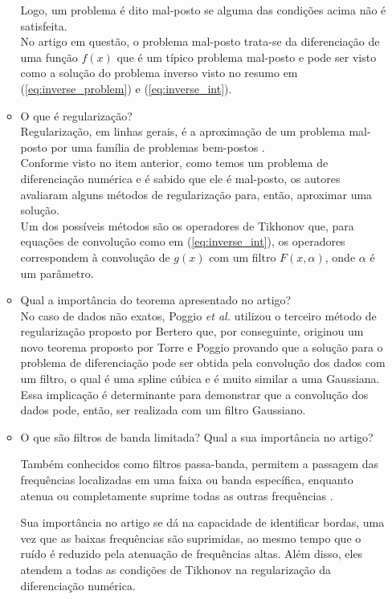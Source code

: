 \documentclass[12pt]{article}
\begin{document}
\begin{itemize}
\begin{itemize}
Logo, um problema é dito mal-posto se alguma das condições acima não é satisfeita.  
\\No artigo em questão, o problema mal-posto trata-se da diferenciação de uma função $f(x)$ que é um típico problema mal-posto e pode ser visto como a solução do problema inverso visto no resumo em (\ref{eq:inverse_problem}) e (\ref{eq:inverse_int}).\\

\item O que é regularização?
\\Regularização, em linhas gerais, é a aproximação de um problema mal-posto por uma família de problemas bem-postos \cite{Engl-1981}.
\\Conforme visto no item anterior, como temos um problema de diferenciação numérica e é sabido que ele é mal-posto, os autores 
avaliaram alguns métodos de regularização para, então, aproximar uma solução.
\\Um dos possíveis métodos são os operadores de Tikhonov que, para equações de convolução como em (\ref{eq:inverse_int}),
os operadores correspondem à convolução de $g(x)$ com um filtro $F(x, \alpha)$, onde $\alpha$ é um parâmetro.\\

\item Qual a importância do teorema apresentado no artigo?
\\No caso de dados não exatos, Poggio \textit{et al.} \cite{Poggio1988106} utilizou o terceiro método de regularização proposto por Bertero que, por conseguinte, originou um novo teorema proposto por Torre e Poggio provando que a solução para o problema de diferenciação pode ser obtida pela convolução dos dados com um filtro, o qual é uma spline cúbica e é muito similar a uma Gaussiana.\\
    Essa implicação é determinante para demonstrar que a convolução dos dados pode, então, ser realizada com um filtro Gaussiano.\\

\item O que são filtros de banda limitada? Qual a sua importância no artigo?
    
    Também conhecidos como filtros passa-banda, permitem a passagem das frequências localizadas em uma faixa ou banda específica, enquanto atenua ou completamente suprime todas as outras frequências \cite{pedrini2008analise}.
    
    Sua importância no artigo se dá na capacidade de identificar bordas, uma vez que as baixas frequências são suprimidas, ao mesmo tempo que o ruído é reduzido pela atenuação de frequências altas. Além disso, eles atendem a todas as condições de Tikhonov na regularização da diferenciação numérica.\\


\end{itemize}
\end{itemize}
\end{document}
